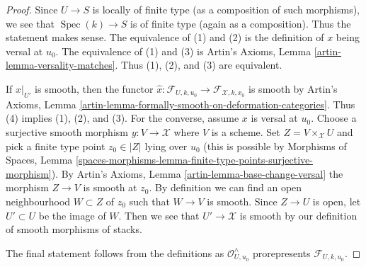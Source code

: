 \documentclass[10pt,a4paper]{amsart}
\theoremstyle{plain}
\theoremstyle{definition}
\theoremstyle{remark}
\numberwithin{equation}{subsection}
\def\Spec{\mathop{\mathrm{Spec}}}
\begin{document}
\begin{proof}
Since $U \to S$ is locally of finite type (as a composition of such morphisms),
we see that $\Spec(k) \to S$ is of finite type (again as a composition).
Thus the statement makes sense. The equivalence of (1) and (2)
is the definition of $x$ being versal at $u_0$.
The equivalence of (1) and (3) is
Artin's Axioms, Lemma \ref{artin-lemma-versality-matches}.
Thus (1), (2), and (3) are equivalent.

\medskip\noindent
If $x|_{U'}$ is smooth, then the functor
$\hat x : \mathcal{F}_{U, k, u_0} \to \mathcal{F}_{\mathcal{X}, k, x_0}$
is smooth by Artin's Axioms, Lemma
\ref{artin-lemma-formally-smooth-on-deformation-categories}.
Thus (4) implies (1), (2), and (3).
For the converse, assume $x$ is versal at $u_0$.
Choose a surjective smooth morphism $y : V \to \mathcal{X}$ where $V$
is a scheme. Set $Z = V \times_\mathcal{X} U$ and pick a finite type
point $z_0 \in |Z|$ lying over $u_0$ (this is possible by
Morphisms of Spaces, Lemma
\ref{spaces-morphisms-lemma-finite-type-points-surjective-morphism}).
By Artin's Axioms, Lemma \ref{artin-lemma-base-change-versal}
the morphism $Z \to V$ is smooth at $z_0$.
By definition we can find an open neighbourhood $W \subset Z$
of $z_0$ such that $W \to V$ is smooth. Since $Z \to U$ is open,
let $U' \subset U$ be the image of $W$. Then we see that
$U' \to \mathcal{X}$ is smooth by our definition of smooth morphisms
of stacks.

\medskip\noindent
The final statement follows from the definitions as
$\mathcal{O}_{U, u_0}^\wedge$
prorepresents $\mathcal{F}_{U, k, u_0}$.
\end{proof}
\end{document}
